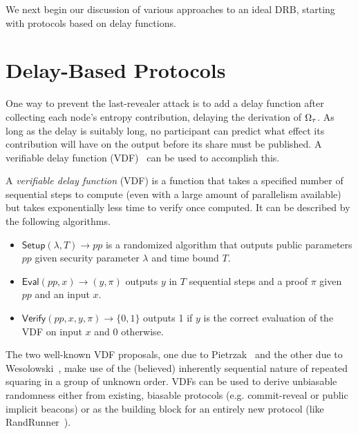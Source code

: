 We next begin our discussion of various approaches to an ideal DRB, starting with protocols based on delay functions.

\section{Delay-Based Protocols}
\label{section:delay}
One way to prevent the last-revealer attack is to add a delay function after collecting each node's entropy contribution, delaying the derivation of $\Omega_\tau$. As long as the delay is suitably long, no participant can predict what effect its contribution will have on the output before its share must be published. A verifiable delay function (VDF)~\cite{boneh2018verifiable,boneh2018survey} can be used to accomplish this.

\begin{definition}
A \textit{verifiable delay function} (VDF) is a function that takes a specified number of sequential steps to compute (even with a large amount of parallelism available) but takes exponentially less time to verify once computed. It can be described by the following algorithms.
\begin{itemize}
\item $\mathsf{Setup}(\lambda, T) \rightarrow pp$ is a randomized algorithm that outputs public parameters $pp$ given security parameter $\lambda$ and time bound $T$.
\item $\mathsf{Eval}(pp, x) \rightarrow (y, \pi)$ outputs $y$ in $T$ sequential steps and a proof $\pi$ given $pp$ and an input $x$.
\item $\mathsf{Verify}(pp, x, y, \pi) \rightarrow \{0, 1\}$ outputs 1 if $y$ is the correct evaluation of the VDF on input $x$ and 0 otherwise.
\end{itemize}
\end{definition}

The two well-known VDF proposals, one due to Pietrzak~\cite{pietrzak2018simple} and the other due to Wesolowski~\cite{wesolowski2019efficient}, make use of the (believed) inherently sequential nature of repeated squaring in a group of unknown order.
VDFs can be used to derive unbiasable randomness either from existing, biasable protocols (e.g. commit-reveal or public implicit beacons) or as the building block for an entirely new protocol (like RandRunner~\cite{schindler2021randrunner}).

